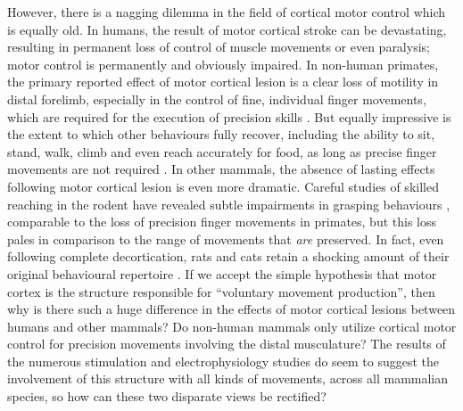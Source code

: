 However, there is a nagging dilemma in the field of cortical motor control which is equally old. In humans, the result of motor cortical stroke can be devastating, resulting in permanent loss of control of muscle movements or even paralysis; motor control is permanently and obviously impaired. In non-human primates, the primary reported effect of motor cortical lesion is a clear loss of motility in distal forelimb, especially in the control of fine, individual finger movements, which are required for the execution of precision skills \cite{Leyton1917,Darling2011}. But equally impressive is the extent to which other behaviours fully recover, including the ability to sit, stand, walk, climb and even reach accurately for food, as long as precise finger movements are not required \cite{Leyton1917,Darling2011}. In other mammals, the absence of lasting effects following motor cortical lesion is even more dramatic. Careful studies of skilled reaching in the rodent have revealed subtle impairments in grasping behaviours \cite{Alaverdashvili2008a}, comparable to the loss of precision finger movements in primates, but this loss pales in comparison to the range of movements that \emph{are} preserved. In fact, even following complete decortication, rats and cats retain a shocking amount of their original behavioural repertoire \cite{Bjursten1976,Terry1989}. If we accept the simple hypothesis that motor cortex is the structure responsible for ``voluntary movement production'', then why is there such a huge difference in the effects of motor cortical lesions between humans and other mammals? Do non-human mammals only utilize cortical motor control for precision movements involving the distal musculature? The results of the numerous stimulation and electrophysiology studies do seem to suggest the involvement of this structure with all kinds of movements, across all mammalian species, so how can these two disparate views be rectified?

